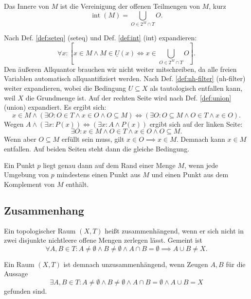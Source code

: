 \begin{Satz}
Das Innere von $M$ ist die Vereinigung der offenen Teilmengen
von $M$, kurz%
\[\operatorname{int}(M) = \bigcup_{O\in 2^M\cap T} O.\]
\end{Satz}

\begin{Beweis}
Nach Def. \ref{def:seteq} (seteq) und Def. \ref{def:int} (int)
expandieren:%
\[\forall x\colon [x\in M\land M\in\underline U(x)
\iff x\in\bigcup_{O\in 2^M\cap T} O].\]
Den äußeren Allquantor brauchen wir nicht weiter mitschreiben, da alle
freien Variablen automatisch allquantifiziert werden.
Nach Def. \ref{def:nh-filter} (nh-filter) weiter expandieren, wobei die
Bedingung $U\subseteq X$ als tautologisch entfallen kann,
weil $X$ die Grundmenge ist. Auf der rechten Seite wird nach Def.
\ref{def:union} (union) expandiert. Es ergibt sich:
\[x\in M\land (\exists O\colon O\in T\land x\in O\land O\subseteq M)
\iff (\exists O\colon O\subseteq M\land O\in T\land x\in O).\]
Wegen $A\land(\exists x\colon P(x))\iff (\exists x\colon A\land P(x))$ ergibt
sich auf der linken Seite:
\[\exists O\colon x\in M\land O\in T\land x\in O\land O\subseteq M.\]
Wenn aber $O\subseteq M$ erfüllt sein muss, gilt
$x\in O\implies x\in M$. Demnach kann $x\in M$ entfallen.
Auf beiden Seiten steht dann die gleiche Bedingung.\,\qedsymbol
\end{Beweis}

\begin{Satz}\label{boundary-point-char}
Ein Punkt $p$ liegt genau dann auf dem Rand einer Menge $M$, wenn
jede Umgebung von $p$ mindestens einen Punkt aus $M$ und
einen Punkt aus dem Komplement von $M$ enthält.
\end{Satz}

\newpage
\subsection{Zusammenhang}

\begin{Definition}\newlinefirst
Ein topologischer Raum $(X,T)$ heißt zusammenhängend, wenn er sich
nicht in zwei disjunkte nichtleere offene Mengen zerlegen lässt. Gemeint ist
\[\forall A,B\in T\colon A\ne\emptyset\land B\ne\emptyset\land A\cap B = \emptyset \implies A\cup B\ne X.\]
\end{Definition}
 Ein Raum $(X,T)$ ist demnach unzusammenhängend, wenn
Zeugen $A,B$ für die Aussage
\[\exists A,B\in T\colon A\ne\emptyset\land B\ne\emptyset\land A\cap B = \emptyset \land A\cup B = X\]
gefunden sind.

